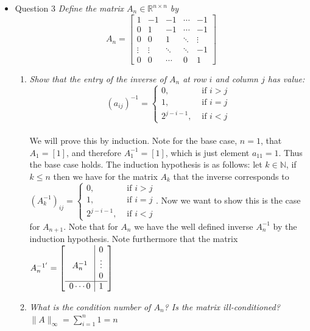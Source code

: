 \documentclass[12pt, letterpaper]{article}
\newcommand{\N}{\mathbb{N}}
\newcommand{\R}{\mathbb{R}}
\begin{document}
\begin{itemize}
	Therefore $(x_1,x_2,x_3,x_4,x_5) = (1,1,1,1,1)$
	\item{Question 3} \textit{Define the matrix $A_n \in \R^{n \times n}$ by 
	$$
	A_n = \begin{bmatrix}
	1 & -1 & -1 & \cdots & -1\\
	0 & 1 & -1 & \cdots & -1\\
	0 & 0 & 1 & \ddots & \vdots\\
	\vdots & \vdots & \ddots & \ddots & -1\\
	0 & 0 & \cdots & 0 & 1
	\end{bmatrix}
	$$	
	}
	\begin{enumerate}
		\item \textit{Show that the entry of the inverse of $A_n$ at row $i$ and column $j$ has value:
		$$
			(a_{ij})^{-1} = \begin{cases}
			0, & \text{ if } i > j\\
			1, & \text{ if } i = j\\
			2^{j - i - 1}, &\text{ if } i < j
			\end{cases}		
		$$}\\
		We will prove this by induction.  Note for the base case, $n=1$, that $A_1= [1]$, and therefore 
		$A_1^{-1} = [1]$, which is just element $a_11 = 1$.  Thus the base case holds.  The induction hypothesis is as 
		follows: let $k \in \N$, if $k \leq n$ then we have for the matrix $A_k$ that the inverse corresponds to 
		$(A_k^{-1})_{ij} = \begin{cases}
			0, & \text{ if } i > j\\
			1, & \text{ if } i = j\\
			2^{j - i - 1}, &\text{ if } i < j
			\end{cases}		$.  Now we want to show this is the case for $A_{n+1}$.  Note that for $A_{n}$ we have the 
			well defined inverse $A_n^{-1}$ by the induction hypothesis.  Note furthermore that the matrix 
			$A_n^{-1'} = \left[ \begin{array}{c|c}
			& 0\\
			\smash{\scalebox{1}{$A_n^{-1}$}} & \vdots\\
			&0\\
			\hline 0 \cdots 0 & 1 \end{array}	\right] $

		\item \textit{What is the condition number of $A_n$? Is the matrix ill-conditioned?}\\
		$\|A\|_\infty = \sum_{i=1}^n 1 = n$  
\end{enumerate}	 
\end{itemize}
\end{document}
